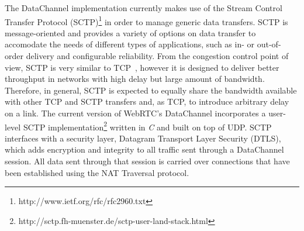 \documentclass{sig-alternate}
\begin{document}
The DataChannel implementation currently makes use of the Stream Control Transfer Protocol
(SCTP)\footnote{http://www.ietf.org/rfc/rfc2960.txt} in order to manage generic data transfers. SCTP is message-oriented
and provides a variety of options on data transfer to accomodate the needs of different
types of applications, such as in- or out-of-order delivery and configurable reliability.
From the congestion control point of view, SCTP is very similar to TCP~\cite{htcp},
however it is designed to deliver better throughput in networks with high delay but large
amount of bandwidth. Therefore, in general, SCTP is expected to equally share the
bandwidth available with other TCP and SCTP transfers and, as TCP, to introduce arbitrary
delay on a link. The current version of WebRTC's DataChannel incorporates a user-level SCTP
implementation\footnote{http://sctp.fh-muenster.de/sctp-user-land-stack.html} written in
\textit{C} and built on top of UDP. SCTP interfaces with a security layer, Datagram
Transport Layer Security (DTLS), which adds encryption and integrity to all traffic sent
through a DataChannel session. All data sent through that session is carried over
connections that have been established using the NAT Traversal protocol.


\end{document}
